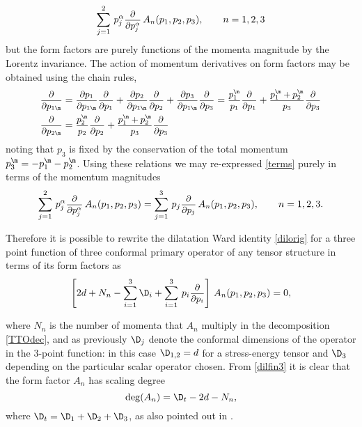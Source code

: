 \documentclass[a4paper,11pt,openright,twoside]{book}
\let\a=\alpha   \let\b=\beta   \let\g=\gamma   \let\d=\delta
\newcommand{\sdfrac}[2]{\mbox{\small$\displaystyle\frac{#1}{#2}$}}
\numberwithin{equation}{section}
\begin{document}
{{\begin{equation}
	\sum_{j=1}^2\,p_j^\a \sdfrac{\partial}{\partial p_j^\a}\,A_n(p_1,p_2,p_3),\qquad n=1,2,3\label{terms}
\end{equation}
but the form factors are purely functions of the momenta magnitude by the Lorentz invariance. The action of momentum derivatives on form factors may be obtained using the chain rules,
\begin{equation}
	\begin{split}
		\sdfrac{\partial}{\partial p_{1\m}}&=\sdfrac{\partial p_1}{\partial p_{1\m}}\sdfrac{\partial}{\partial p_1}+\sdfrac{\partial p_2}{\partial p_{1\m}}\sdfrac{\partial}{\partial p_2}+\sdfrac{\partial p_3}{\partial p_{1\m}}\sdfrac{\partial}{\partial p_3}=\sdfrac{p_1^\m}{p_1}\sdfrac{\partial}{\partial p_1}+\sdfrac{p_1^\m+p_2^\m}{p_3}\sdfrac{\partial}{\partial p_3}\\
		\sdfrac{\partial}{\partial p_{2\m}}&=\sdfrac{p_2^\m}{p_2}\sdfrac{\partial}{\partial p_2}+\sdfrac{p_1^\m+p_2^\m}{p_3}\sdfrac{\partial}{\partial p_3}
	\end{split}\label{chainrule}
\end{equation}
noting that $p_3$ is fixed by the conservation of the total momentum $p^\m_3=-p^\m_1-p^\m_2$. Using these relations we may re-expressed \eqref{terms} purely in terms of the momentum magnitudes 
\begin{equation}
	\sum_{j=1}^2\,p_j^\a \sdfrac{\partial}{\partial p_j^\a}\,A_n(p_1,p_2,p_3)=\sum_{j=1}^3\,p_j \sdfrac{\partial}{\partial p_j}\,A_n(p_1,p_2,p_3),\qquad n=1,2,3.
\end{equation}

Therefore it is possible to rewrite the dilatation Ward identity \eqref{dilorig} for a three point function of three conformal primary operator of any tensor structure in terms of its form factors as
\begin{equation}
	\left[2d+N_n-\sum_{i=1}^3\D_i+\sum_{i=1}^{3}\,p_i\sdfrac{\partial}{\partial p_i}\right]\,A_n(p_1,p_2,p_3)=0,\label{dilfin3}
\end{equation}
{where $N_n$ is the number of momenta that $A_n$ multiply in the decomposition \eqref{TTOdec}, and as previously $\D_j$ denote the conformal dimensions of the operator in the 3-point function: in this case $\D_{1,2}=d$ for a stress-energy tensor and $\D_3$ depending on the particular scalar operator chosen. From \eqref{dilfin3} it is clear that the form factor $A_n$ has scaling degree
	\begin{equation}
		\deg(A_n)=\D_t-2d-N_n,\label{deg}
	\end{equation}
	where $\D_t=\D_1+\D_2+\D_3$, as also pointed out in \cite{Bzowski:2013sza}. 
	
}}}
\end{document}
